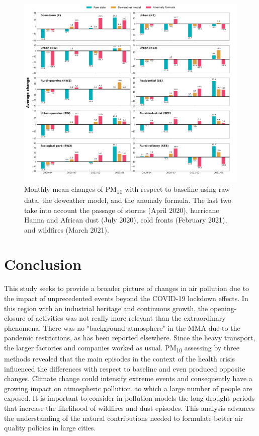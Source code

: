 \documentclass[sn-mathphys-num]{sn-jnl}
\begin{document}
\begin{figure}[ht!]
	\centering
	\includegraphics[width=\linewidth]{figures/average_change_deweather_fourier.png}
	\caption{Monthly mean changes of PM\textsubscript{10} with respect to baseline using raw data, the deweather model, and the anomaly formula. The last two take into account the passage of storms (April 2020), hurricane Hanna and African dust (July 2020), cold fronts (February 2021), and wildfires (March 2021).
	}
	\label{fig:average_change_deweather_fourier}
\end{figure}
\section{Conclusion}
This study seeks to provide a broader picture of changes in air pollution due to the impact of unprecedented events beyond the COVID-19 lockdown effects. In this region with an industrial heritage and continuous growth, the opening-closure of activities was not really more relevant than the extraordinary phenomena. There was no "background atmosphere" in the MMA due to the pandemic restrictions, as has been reported elsewhere. Since the heavy transport, the larger factories and companies worked as usual. PM\textsubscript{10} assessing by three methods revealed that the main episodes in the context of the health crisis influenced the differences with respect to baseline and even produced opposite changes. Climate change could intensify extreme events and consequently have a growing impact on atmospheric pollution, to which a large number of people are exposed. It is important to consider in pollution models the long drought periods that increase the likelihood of wildfires and dust episodes. This analysis advances the understanding of the natural contributions needed to formulate better air quality policies in large cities.
\end{document}
